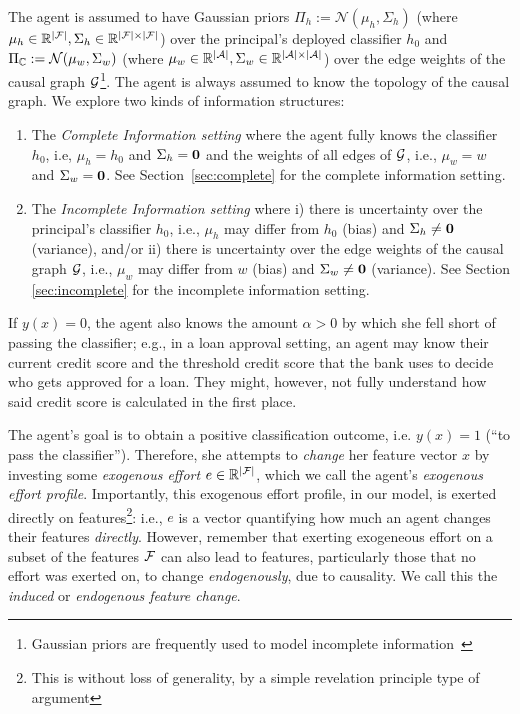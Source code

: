  The agent is assumed to have Gaussian priors $\Pi_h := \mathcal{N}(\mu_h, \Sigma_h)$ (where $\mu_h \in \mathbb{R}^{|\mathcal{F}|}, \Sigma_h \in \mathbb{R}^{|\mathcal{F}|\times |\mathcal{F}|}$) over the principal's deployed classifier $h_0$ and $\Pi_{\mathbb{C}} := \mathcal{N}(\mu_w, \Sigma_w)$ (where $\mu_w \in \mathbb{R}^{|\mathcal{A}|}, \Sigma_w \in \mathbb{R}^{|\mathcal{A}| \times |\mathcal{A}|}$) over the edge weights of the causal graph $\mathcal{G}$\footnote{Gaussian priors are frequently used to model incomplete information~\cite{kong2020information,elzayn2019price}}. The agent is always assumed to know the topology of the causal graph. We explore two kinds of information structures: 
\begin{enumerate}
    \item The \textit{Complete Information setting} where the agent fully knows the classifier $h_0$, i.e, $\mu_h = h_0$ and $\Sigma_h = \bf{0}$ and the weights of all edges of $\mathcal{G}$, i.e., $\mu_w = w$ and $\Sigma_w = \bf{0}$. See Section~\ref{sec:complete} for the complete information setting. 
    \item The \textit{Incomplete Information setting} where i) there is uncertainty over the principal's classifier $h_0$, i.e., $\mu_h$ may differ from $h_0$ (bias) and $\Sigma_h \neq \bf{0}$ (variance), and/or ii) there is uncertainty over the edge weights of the causal graph $\mathcal{G}$, i.e., $\mu_w$ may differ from $w$ (bias) and $\Sigma_w \neq \bf{0}$ (variance). See Section \ref{sec:incomplete} for the incomplete information setting. 
\end{enumerate}
If $y(x) = 0$, the agent also knows the amount $\alpha > 0$ by which she fell short of passing the classifier; e.g., in a loan approval setting, an agent may know their current credit score and the threshold credit score that the bank uses to decide who gets approved for a loan. They might, however, not fully understand how said credit score is calculated in the first place.

The agent's goal is to obtain a positive classification outcome, i.e. $y(x) = 1$ (``to pass the classifier''). Therefore, she attempts to \emph{change} her feature vector $x$ by investing some \emph{exogenous effort} $e \in \mathbb{R}^{|\mathcal{F}|}$, which we call the agent's \emph{exogenous effort profile}. Importantly, this exogenous effort profile, in our model, is exerted directly on features\footnote{This is without loss of generality, by a simple revelation principle type of argument}: i.e., $e$ is a vector quantifying how much an agent changes their features \emph{directly}. However, remember that exerting exogeneous effort on a subset of the features $\mathcal{F}$ can also lead to features, particularly those that no effort was exerted on, to change \emph{endogenously}, due to causality. We call this the \emph{induced} or \emph{endogenous feature change}.

